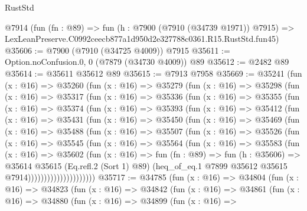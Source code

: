 \begin{lexlean}{RustStd}
\begin{coremodule}
    @7914
    (fun (fn : @89) =>
    fun (h : @7900 (@7910 (@34739 @1971)) @7915) =>
    LexLeanPreserve.C0992ceecb877a1d950d2e327788c0361.R15.RustStd.fun45)
@35606 := @7900 (@7910 (@34725 @4009)) @7915
@35611 := Option.noConfusion.{0, 0} (@7879 (@34730 @4009)) @89
@35612 := @2482 @89
@35614 := @35611 @35612 @89
@35615 := @7913 @7958
@35669 := @35241
    (fun (x : @16) =>
    @35260
      (fun (x : @16) =>
      @35279
        (fun (x : @16) =>
        @35298
          (fun (x : @16) =>
          @35317
            (fun (x : @16) =>
            @35336
              (fun (x : @16) =>
              @35355
                (fun (x : @16) =>
                @35374
                  (fun (x : @16) =>
                  @35393
                    (fun (x : @16) =>
                    @35412
                      (fun (x : @16) =>
                      @35431
                        (fun (x : @16) =>
                        @35450
                          (fun (x : @16) =>
                          @35469
                            (fun (x : @16) =>
                            @35488
                              (fun (x : @16) =>
                              @35507
                                (fun (x : @16) =>
                                @35526
                                  (fun (x : @16) =>
                                  @35545
                                    (fun (x : @16) =>
                                    @35564
                                      (fun (x : @16) =>
                                      @35583
                                        (fun (x : @16) =>
                                        @35602
                                          (fun (x : @16) =>
                                          fun (fn : @89) =>
                                          fun (h : @35606) =>
                                          @35614
                                            @35615
                                            (Eq.refl.{2} (Sort 1) @89)
                                            (heq_of_eq.{1}
                                              @7899
                                              @35612
                                              @35615
                                              @7914)))))))))))))))))))))
@35717 := @34785
    (fun (x : @16) =>
    @34804
      (fun (x : @16) =>
      @34823
        (fun (x : @16) =>
        @34842
          (fun (x : @16) =>
          @34861
            (fun (x : @16) =>
            @34880
              (fun (x : @16) =>
              @34899
                (fun (x : @16) =>

\end{coremodule}
\end{lexlean}
